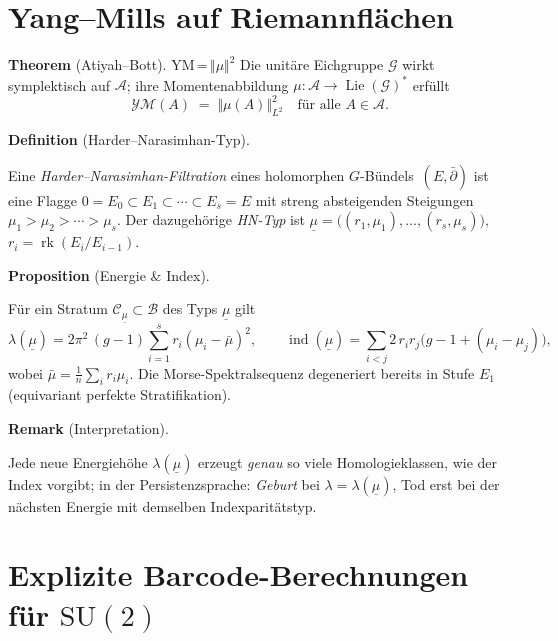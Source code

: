 \documentclass[10pt, letterpaper]{article}
\newcommand{\CustomHeading}[3]{%
  \par\medskip\noindent%
  \textbf{#1 #2} \textnormal{(#3)}.\enskip%
}
\newenvironment{DEF}[2]{\CustomHeading{Definition}{#1}{#2}}{}
\newenvironment{PROP}[2]{\CustomHeading{Proposition}{#1}{#2}}{}
\newenvironment{THEO}[2]{\CustomHeading{Theorem}{#1}{#2}}{}
\newenvironment{REM}[2]{\CustomHeading{Remark}{#1}{#2}}{}
\begin{document}
\section{Yang--Mills auf Riemannflächen}

\begin{THEO}{}{Atiyah--Bott}{YM\,=\,\(\Vert\mu\Vert^2\)}
  Die unitäre Eichgruppe \(\mathcal G\) wirkt symplektisch auf \(\mathcal A\);
  ihre Momentenabbildung
  \(\mu\colon\mathcal A\to\operatorname{Lie}(\mathcal G)^\ast\)
  erfüllt
  \[
    \mathcal{YM}(A)\;=\;\Vert\mu(A)\Vert_{L^2}^2
    \quad\text{für alle }A\in\mathcal A.
  \]
\end{THEO}

\begin{DEF}{}{Harder--Narasimhan-Typ}
  Eine \emph{Harder--Narasimhan-Filtration} eines holomorphen
  \(G\)-Bündels~\((E,\bar\partial)\) ist eine Flagge
  \(
    0=E_0\subset E_1\subset\cdots\subset E_s=E
  \)
  mit streng absteigenden Steigungen
  \(\mu_1>\mu_2>\cdots>\mu_s\).  
  Der dazugehörige \emph{HN-Typ} ist
  \(
    \underline\mu=\bigl((r_1,\mu_1),\dots,(r_s,\mu_s)\bigr),
  \)
  \(r_i=\operatorname{rk}(E_i/E_{i-1})\).
\end{DEF}

\begin{PROP}{}{Energie \& Index}
  Für ein Stratum \(\mathcal C_{\underline\mu}\subset\mathcal B\) des Typs
  \(\underline\mu\) gilt
  \[
    \lambda(\underline\mu)
      =2\pi^2\,(g-1)\sum_{i=1}^s r_i(\mu_i-\bar\mu)^2,
    \qquad
    \operatorname{ind}(\underline\mu)
      =\sum_{i<j}2\,r_ir_j\bigl(g-1+(\mu_i-\mu_j)\bigr),
  \]
  wobei \(\bar\mu=\tfrac1n\sum_i r_i\mu_i\).
  Die Morse-Spektralsequenz degeneriert bereits in Stufe
  \(E_1\) (equivariant perfekte Stratifikation).
\end{PROP}

\begin{REM}{}{Interpretation}
  Jede neue Energiehöhe \(\lambda(\underline\mu)\) erzeugt \emph{genau} so viele
  Homologie­klassen, wie der Index vorgibt; in der Persistenzsprache:
  \emph{Geburt} bei \(\lambda=\lambda(\underline\mu)\), Tod erst bei der
  nächsten Energie mit demselben Indexparitäts­typ.
\end{REM}

\section{Explizite Barcode-Berechnungen für \texorpdfstring{$\mathrm{SU}(2)$}{SU(2)}}
\end{document}
